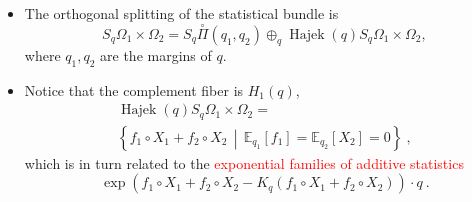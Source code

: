 \documentclass[xcolor=svgnames]{beamer}
\DeclareMathOperator{\Hajek}{Hajek}
\newcommand{\expectat}[2]{\mathbb E_{#1}\left[#2\right]}
\newcommand{\expfibreat}[2]{S_{#1}#2}
\newcommand{\expof}[1]{\exp\left(#1\right)}
\newcommand{\hajekof}[1]{\Hajek\left(#1\right)}
\newcommand{\openplan}[2]{\overset{\circ}\Pi\left(#1,#2\right)}
\newcommand{\rosso}[1]{\textcolor{red}{#1}}
\newcommand{\setof}[2]{\left\{#1 \, \middle| \, #2 \right\}}
\renewcommand{\emph}{\rosso}
\begin{document}
\begin{frame}
\begin{itemize}
\item The orthogonal splitting of the statistical bundle is
\begin{equation*}
    \expfibreat q {\Omega_1 \times \Omega_2} = S_q \openplan{q_1}{q_2} \oplus_q \hajekof{q}\expfibreat q {\Omega_1 \times \Omega_2},
\end{equation*}
where $q_1, q_2$ are the margins of $q$.

\item Notice that the complement fiber is $H_1(q)$,
\begin{multline*}
  \hajekof{q}\expfibreat q {\Omega_1 \times \Omega_2} = \\ \setof {f_1 \circ X_1 + f_2 \circ X_2}{\expectat {q_1}{f_1} = \expectat {q_2}{X_2} = 0} \ ,
 \end{multline*}
  which is in turn related to the \emph{exponential families of additive statistics} 
  \begin{equation*}
      \expof{f_1 \circ X_1 + f_2 \circ X_2 - K_q(f_1 \circ X_1 + f_2 \circ X_2)} \cdot q \ .
  \end{equation*}
\end{itemize}
\end{frame}
\end{document}
